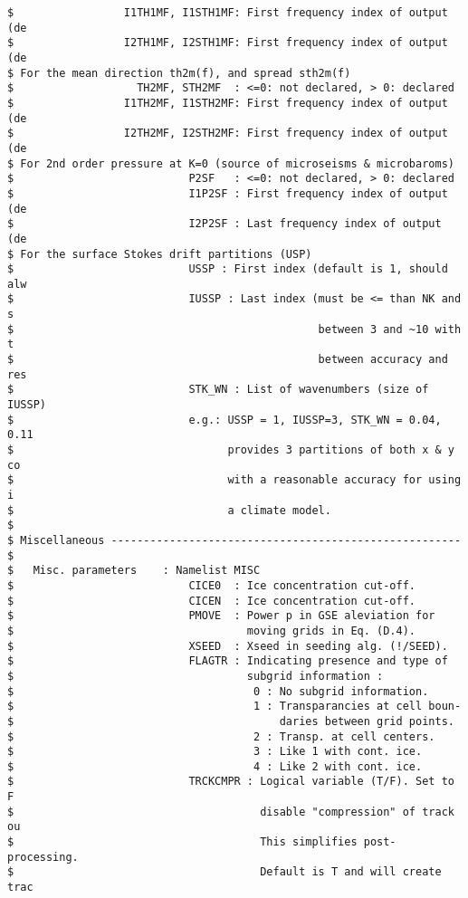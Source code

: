 \begin{footnotesize}
\begin{verbatim}
$                 I1TH1MF, I1STH1MF: First frequency index of output (de
$                 I2TH1MF, I2STH1MF: First frequency index of output (de
$ For the mean direction th2m(f), and spread sth2m(f)     
$                   TH2MF, STH2MF  : <=0: not declared, > 0: declared
$                 I1TH2MF, I1STH2MF: First frequency index of output (de
$                 I2TH2MF, I2STH2MF: First frequency index of output (de
$ For 2nd order pressure at K=0 (source of microseisms & microbaroms)
$                           P2SF   : <=0: not declared, > 0: declared
$                           I1P2SF : First frequency index of output (de
$                           I2P2SF : Last frequency index of output  (de
$ For the surface Stokes drift partitions (USP)
$                           USSP : First index (default is 1, should alw
$                           IUSSP : Last index (must be <= than NK and s
$                                               between 3 and ~10 with t
$                                               between accuracy and res
$                           STK_WN : List of wavenumbers (size of IUSSP)
$                           e.g.: USSP = 1, IUSSP=3, STK_WN = 0.04, 0.11
$                                 provides 3 partitions of both x & y co
$                                 with a reasonable accuracy for using i
$                                 a climate model. 
$
$ Miscellaneous ------------------------------------------------------ $
$   Misc. parameters    : Namelist MISC
$                           CICE0  : Ice concentration cut-off.
$                           CICEN  : Ice concentration cut-off.
$                           PMOVE  : Power p in GSE aleviation for
$                                    moving grids in Eq. (D.4).
$                           XSEED  : Xseed in seeding alg. (!/SEED).
$                           FLAGTR : Indicating presence and type of
$                                    subgrid information :
$                                     0 : No subgrid information.
$                                     1 : Transparancies at cell boun-
$                                         daries between grid points.
$                                     2 : Transp. at cell centers.
$                                     3 : Like 1 with cont. ice.
$                                     4 : Like 2 with cont. ice.
$                           TRCKCMPR : Logical variable (T/F). Set to F 
$                                      disable "compression" of track ou
$                                      This simplifies post-processing.
$                                      Default is T and will create trac

\end{verbatim}
\end{footnotesize}
